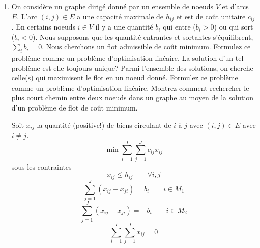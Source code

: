 \begin{enumerate}
  \item On considère  un graphe dirigé donné par un ensemble de noeuds $V$ et d'arcs $E$. L'arc
    $(i, j) \in E$ a une  capacité maximale de
    $h_{ij}$ et est de coût unitaire
    $c_{ij}$. En certains noeuds
    $i \in V$ il y a une quantité
    $b_i$ qui entre  ($b_i >0$) ou qui sort ($b_i <0$). Nous supposons que les quantité entrantes et sortantes s'équilibrent, $\sum_i b_i=0$. Nous
    cherchons un flot admissible de coût minimum.  Formulez ce problème comme un problème d'optimisation linéaire. La solution d'un tel problème est-elle
    toujours unique? Parmi l'ensemble des solutions, on cherche celle(s) qui maximisent le flot en un noeud donn\'e.
    Formulez ce probl\`eme comme un probl\`eme d'optimisation lin\'eaire. Montrez comment  rechercher le   plus court chemin entre deux noeuds dans un
    graphe au moyen de la solution d'un  problème de flot de coût minimum.

    \begin{solution}
      Soit $x_{ij}$ la quantité (positive!) de biens circulant de $i$ à $j$ avec $(i,j) \in E$ avec $i \ne j$. 
      $$ \min \sum_{i=1}^I \sum_{j=1}^J c_{ij}x_{ij}$$
      sous les contraintes
      $$x_{ij} \le h_{ij} \qquad \forall i,j$$
      $$\sum_{j=1}^J (x_{ij} - x_{ji}) = b_{i} \qquad i \in M_{1}$$
      $$\sum_{j=1}^J (x_{ij} - x_{ji}) = -b_{i} \qquad i \in M_{2}$$
      $$\sum_{i=1}^I \sum_{j=1}^J x_{ij} = 0 $$

    \end{solution}



\end{enumerate}
